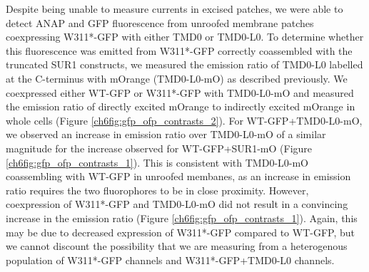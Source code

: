 Despite being unable to measure currents in excised patches, we were able to detect ANAP and GFP fluorescence from unroofed membrane patches coexpressing W311*-GFP with either TMD0 or TMD0-L0.
To determine whether this fluorescence was emitted from W311*-GFP correctly coassembled with the truncated SUR1 constructs, we measured the emission ratio of TMD0-L0 labelled at the C-terminus with mOrange (TMD0-L0-mO) as described previously.
We coexpressed either WT-GFP or W311*-GFP with TMD0-L0-mO and measured the emission ratio of directly excited mOrange to indirectly excited mOrange in whole cells (Figure \ref{ch6fig:gfp_ofp_contrasts_2}).
For WT-GFP+TMD0-L0-mO, we observed an increase in emission ratio over TMD0-L0-mO of a similar magnitude for the increase observed for WT-GFP+SUR1-mO (Figure \ref{ch6fig:gfp_ofp_contrasts_1}).
This is consistent with TMD0-L0-mO coassembling with WT-GFP in unroofed membanes, as an increase in emission ratio requires the two fluorophores to be in close proximity.
However, coexpression of W311*-GFP and TMD0-L0-mO did not result in a convincing increase in the emission ratio (Figure \ref{ch6fig:gfp_ofp_contrasts_1}).
Again, this may be due to decreased expression of W311*-GFP compared to WT-GFP, but we cannot discount the possibility that we are measuring from a heterogenous population of W311*-GFP channels and W311*-GFP+TMD0-L0 channels.

